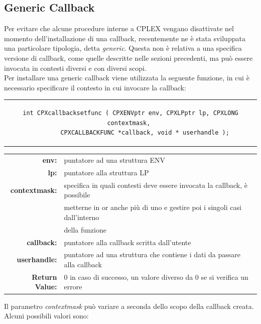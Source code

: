 \subsection{Generic Callback}%
Per evitare che alcune procedure interne a CPLEX vengano disattivate nel momento dell'installazione di una callback, recentemente ne è stata sviluppata una particolare tipologia, detta \textit{generic}. Questa non è relativa a una specifica versione di callback, come quelle descritte nelle sezioni precedenti, ma può essere invocata in contesti diversi e con diversi scopi.\\
Per installare una generic callback viene utilizzata la seguente funzione, in cui  è necessario specificare il contesto in cui invocare la callback:
\vspace{1 cm}
\begin{center}
\begin{tabular}{c}
\begin{lstlisting}[linewidth=380pt, basicstyle=\footnotesize\sffamily,]    
int CPXcallbacksetfunc ( CPXENVptr env, CPXLPptr lp, CPXLONG contextmask, 
		CPXCALLBACKFUNC *callback, void * userhandle );
\end{lstlisting}
\end{tabular}
\end{center}
\begin{table}[h]
\centering
\begin{tabular}{rl}
\textbf{env:} & {puntatore ad una struttura ENV}\\
\textbf{lp:} & {puntatore alla struttura LP}\\
\textbf{contextmask:} & {specifica in quali contesti deve essere invocata la callback, è possibile }\\
&{metterne in or anche più di uno e gestire poi i singoli casi dall'interno}\\
&{della funzione}\\
\textbf{callback:} & {puntatore alla callback scritta dall'utente} \\
\textbf{userhandle:} & {puntatore ad una struttura che contiene i dati da passare alla callback} \\
\textbf{Return Value:} & {0 in caso di successo, un valore diverso da 0 se si verifica un errore}\\
\end{tabular}
\end{table}
Il parametro \textit{contextmask} può variare a seconda dello scopo della callback creata. Alcuni possibili valori sono:
